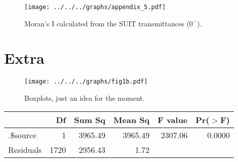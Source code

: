 \documentclass[12pt,a4paper]{scrartcl}
\begin{document}
\begin{figure}[h]
	\centering
	\texttt{[image: ../../../graphs/appendix\_5.pdf]}
	\caption{Moran's I calculated from the SUIT transmittances ($0^-$).}
\end{figure}

\clearpage
\section*{Extra}

\begin{figure}[h]
	\centering
	\texttt{[image: ../../../graphs/fig1b.pdf]}
	\caption{Boxplots, just an idea for the moment.}
\end{figure}

\begin{table}[ht]
	\centering
	\begin{tabular}{lrrrrr}
		\hline
		          & Df   & Sum Sq  & Mean Sq & F value & Pr($>$F) \\
		\hline
		.\$source & 1    & 3965.49 & 3965.49 & 2307.06 & 0.0000   \\
		Residuals & 1720 & 2956.43 & 1.72    &         &          \\
		\hline
	\end{tabular}
\end{table}

\clearpage
\printbibliography
\end{document}
